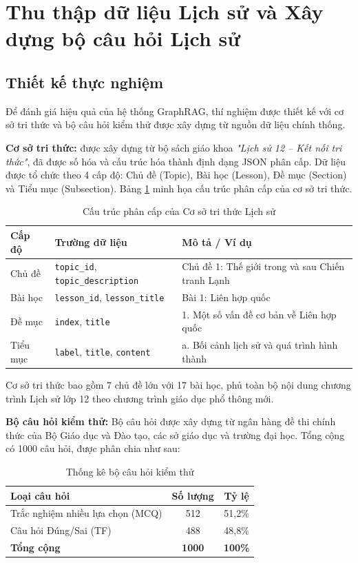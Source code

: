 \section{Thu thập dữ liệu Lịch sử và Xây dựng bộ câu hỏi Lịch sử}
\subsection{Thiết kế thực nghiệm}
\label{sec:exp_design}

Để đánh giá hiệu quả của hệ thống GraphRAG, thí nghiệm được thiết kế với cơ sở tri thức và bộ câu hỏi kiểm thử được xây dựng từ nguồn dữ liệu chính thống.

\textbf{Cơ sở tri thức:} được xây dựng từ bộ sách giáo khoa \textit{"Lịch sử 12 – Kết nối tri thức"}, đã được số hóa và cấu trúc hóa thành định dạng JSON phân cấp. Dữ liệu được tổ chức theo 4 cấp độ: Chủ đề (Topic), Bài học (Lesson), Đề mục (Section) và Tiểu mục (Subsection). Bảng \ref{tab:kb_structure} minh họa cấu trúc phân cấp của cơ sở tri thức.

\begin{table}[H]
\centering
\caption{Cấu trúc phân cấp của Cơ sở tri thức Lịch sử}
\begin{tabular}{|p{3cm}|p{4cm}|p{7cm}|}
\hline
\textbf{Cấp độ} & \textbf{Trường dữ liệu} & \textbf{Mô tả / Ví dụ} \\
\hline
Chủ đề & \texttt{topic\_id}, \texttt{topic\_description} & Chủ đề 1: Thế giới trong và sau Chiến tranh Lạnh \\
\hline
Bài học & \texttt{lesson\_id}, \texttt{lesson\_title} & Bài 1: Liên hợp quốc \\
\hline
Đề mục & \texttt{index}, \texttt{title} & 1. Một số vấn đề cơ bản về Liên hợp quốc \\
\hline
Tiểu mục & \texttt{label}, \texttt{title}, \texttt{content} & a. Bối cảnh lịch sử và quá trình hình thành \\
\hline
\end{tabular}
\label{tab:kb_structure}
\end{table}

Cơ sở tri thức bao gồm 7 chủ đề lớn với 17 bài học, phủ toàn bộ nội dung chương trình Lịch sử lớp 12 theo chương trình giáo dục phổ thông mới.

\textbf{Bộ câu hỏi kiểm thử:}
Bộ câu hỏi được xây dựng từ ngân hàng đề thi chính thức của Bộ Giáo dục và Đào tạo, các sở giáo dục và trường đại học. Tổng cộng có 1000 câu hỏi, được phân chia như sau:

\begin{table}[H]
\centering
\caption{Thống kê bộ câu hỏi kiểm thử}
\begin{tabular}{|l|c|c|}
\hline
\textbf{Loại câu hỏi} & \textbf{Số lượng} & \textbf{Tỷ lệ} \\
\hline
Trắc nghiệm nhiều lựa chọn (MCQ) & 512 & 51,2\% \\
\hline
Câu hỏi Đúng/Sai (TF) & 488 & 48,8\% \\
\hline
\textbf{Tổng cộng} & \textbf{1000} & \textbf{100\%} \\
\hline
\end{tabular}
\label{tab:question_stats}
\end{table}

